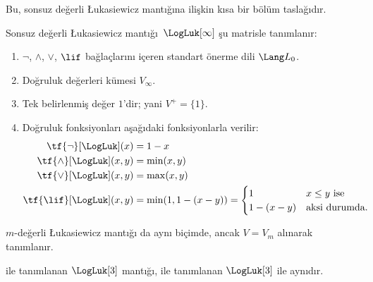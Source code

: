 \documentclass[../../../include/open-logic-section]{subfiles}
\begin{document}


\begin{editorial}
  Bu, sonsuz değerli \L ukasiewicz mantığına ilişkin kısa bir bölüm
  taslağıdır.
\end{editorial}

\begin{defn} Sonsuz değerli \L ukasiewicz
mantığı~$\LogLuk[\infty]$ şu matrisle tanımlanır:
\begin{enumerate}
  \item $\lnot$, $\land$, $\lor$, $\lif$ bağlaçlarını içeren standart
  önerme dili $\Lang L_0$.
  \item Doğruluk değerleri kümesi $V_\infty$.
  \item Tek belirlenmiş değer $1$'dir; yani $V^+ = \{1\}$.
  \item Doğruluk fonksiyonları aşağıdaki fonksiyonlarla verilir:
  \begin{align*}
    \tf{\lnot}[\LogLuk](x) & = 1 - x\\
    \tf{\land}[\LogLuk](x,y) & = \min(x,y)\\
    \tf{\lor}[\LogLuk](x,y) & = \max(x,y)\\
    \tf{\lif}[\LogLuk](x,y) & = \min(1,1-(x-y)) = \begin{cases}
      1 & \text{$x \le y$ ise}\\
      1-(x-y) & \text{aksi durumda.}
    \end{cases}
    \end{align*}
\end{enumerate}
$m$-değerli \L ukasiewicz mantığı da aynı biçimde, ancak $V = V_m$
alınarak tanımlanır.
\end{defn}

\begin{prop}
   ile tanımlanan $\LogLuk[3]$ mantığı,
   ile tanımlanan $\LogLuk[3]$ ile aynıdır.
\end{prop}
\end{document}

